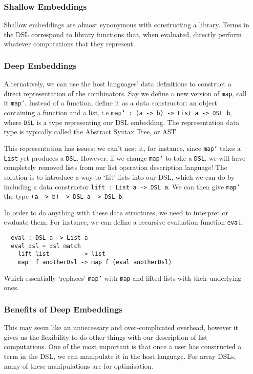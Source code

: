 \documentclass[a4paper,12pt]{article}
\newcommand{\icf}[1]{\mbox{\texttt{#1}}} %
\begin{document}
\subsubsection*{Shallow Embeddings} 
Shallow embeddings are almost synonymous with constructing a library. 
Terms in the DSL correspond to library functions that, when evaluated, directly perform whatever computations that they represent.

\subsubsection*{Deep Embeddings} 
Alternatively, we can use the host languages' data definitions to construct a direct representation of the combinators. 
Say we define a new version of \icf{map}, call it \icf{map'}.
Instead of a function, define it as a data constructor: an object containing a function and a list, i.e \texttt{map'\ :\ (a\ ->\ b)\ ->\ List\ a\ ->\ DSL\ b}, where \icf{DSL} is a type representing our DSL embedding. 
The representation data type is typically called the Abstract Syntax Tree, or AST.

This representation has issues: we can't nest it, for instance, since \icf{map'} takes a \icf{List} yet produces a \icf{DSL}. 
However, if we change \icf{map'} to take a \icf{DSL}, we will have completely removed lists from our list operation description language! 
The solution is to introduce a way to `lift' lists into our DSL, which we can do by  including a data constructor \texttt{lift\ :\ List\ a\ ->\ DSL\ a}. 
We can then give \icf{map'} the type \icf{(a\ ->\ b)\ ->\ DSL\ a\ ->\ DSL\ b}.

In order to do anything with these data structures, we need to interpret or evaluate them. 
For instance, we can define a recursive evaluation function \icf{eval}:

\begin{verbatim}
  eval : DSL a -> List a
  eval dsl = dsl match
    lift list         -> list
    map' f anotherDsl -> map f (eval anotherDsl)
\end{verbatim}

Which essentially `replaces' \icf{map'} with \icf{map} and lifted lists with their underlying ones.

\subsubsection*{Benefits of Deep Embeddings}
This may seem like an unnecessary and over-complicated overhead, however it gives us the flexibility to do other things with our description of list computations. 
One of the most important is that once a user has constructed a term in the DSL, we can manipulate it in the host language. 
For array DSLs, many of these manipulations are for optimisation.
\end{document}
